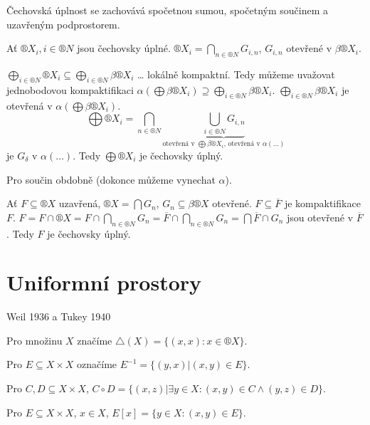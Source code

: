 \documentclass[12pt]{article}					%
\begin{document}
    \begin{tvrzeni}
        Čechovská úplnost se zachovává spočetnou sumou, spočetným součinem a uzavřeným podprostorem.

        \begin{dukazin}
            Ať $®X_i, i \in ®N$ jsou čechovsky úplné. $®X_i = \bigcap_{n \in ®N}G_{i, n}$, $G_{i, n}$ otevřené v $\beta®X_i$.

            $\bigoplus_{i \in ®N} ®X_i \subseteq \bigoplus_{i \in ®N} \beta®X_i$ … lokálně kompaktní. Tedy můžeme uvažovat jednobodovou kompaktifikaci $\alpha(\bigoplus \beta®X_i) \supseteq \bigoplus_{i \in ®N} \beta®X_i$. $\bigoplus_{i \in ®N} \beta®X_i$ je otevřená v $\alpha(\bigoplus \beta®X_i)$. 
            $$ \bigoplus®X_i = \bigcap_{n \in ®N} \underbrace{\bigcup_{i \in ®N} G_{i, n}}_{\text{otevřená v $\bigoplus\beta®X_i$, otevřená v $\alpha(…)$}} $$
            je $G_\delta$ v $\alpha(…)$. Tedy $\bigoplus ®X_i$ je čechovsky úplný.

            Pro součin obdobně (dokonce můžeme vynechat $\alpha$).

            Ať $F \subseteq ®X$ uzavřená, $®X = \bigcap G_n$, $G_n \subseteq \beta ®X$ otevřené. $F \subseteq \overline{F}$ je kompaktifikace $F$. $F = F\cap ®X = F \cap \bigcap_{n \in ®N} G_n = \overline{F} \cap \bigcap_{n \in ®N} G_n = \bigcap \overline{F} \cap G_n$ jsou otevřené v $\overline{F}$. Tedy $F$ je čechovsky úplný.
        \end{dukazin}
    \end{tvrzeni}


\section{Uniformní prostory}
    Weil 1936 a Tukey 1940

    \begin{poznamka}
        Pro množinu $X$ značíme $\triangle(X) = \{(x, x): x \in ®X\}$.

        Pro $E \subseteq X \times X$ označíme $E^{-1} = \{(y, x)| (x, y) \in E\}$.

        Pro $C, D \subseteq X \times X$, $C \circ D = \{(x, z)| \exists y \in X: (x, y) \in C \land (y, z) \in D\}$.

        Pro $E \subseteq X \times X$, $x \in X$, $E[x] = \{y \in X: (x, y) \in E\}$.
    \end{poznamka}
    
\end{document}
